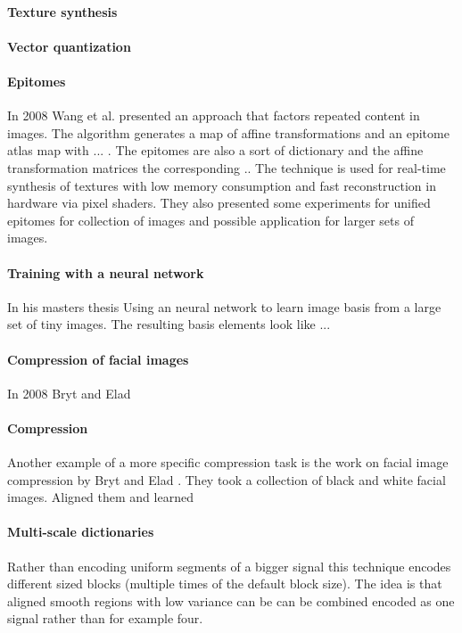 \paragraph{Texture synthesis}\cite{Peyre2008}

\paragraph{Vector quantization}

\paragraph{Epitomes} In 2008 Wang et al.\cite{Wang2008a} presented
an approach that factors repeated content in images. The algorithm generates 
a map of affine transformations and an epitome atlas map with ... . The
epitomes are also a sort of dictionary and the affine transformation matrices
the corresponding .. The technique is used for real-time synthesis of textures
with low memory consumption and  fast reconstruction in hardware via pixel
shaders. They also presented some experiments for unified epitomes for
collection of images and possible application for larger sets of images. 

\paragraph{Training with a neural network} In his masters thesis 
\cite{Krizhevsky2009}
Using an neural network to learn image basis from a large set of tiny images.
The resulting basis elements look like ...

\paragraph{Compression of facial images}
In 2008 Bryt and Elad \cite{Bryt2008} 
\paragraph{Compression} \cite{Lewicki1999,Murray2006}  
Another example of a more specific compression task is the
work on facial image compression by Bryt and Elad \cite{Bryt2008}. 
They took a collection of black and white facial images. Aligned them and
learned  

\paragraph{Multi-scale dictionaries}
Rather than encoding uniform segments of a bigger signal this technique
encodes different sized blocks (multiple times of the default block size). The
idea is that aligned smooth regions with low variance can be can be combined
encoded as one signal rather than for example four.\cite{Mairal2007}

